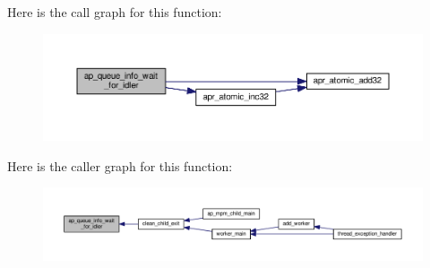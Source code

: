 Here is the call graph for this function\+:
\nopagebreak
\begin{figure}[H]
\begin{center}
\leavevmode
\includegraphics[width=350pt]{group__APACHE__MPM__EVENT_ga61e0f50817329b124d2ea67d9cfe0cbf_cgraph}
\end{center}
\end{figure}




Here is the caller graph for this function\+:
\nopagebreak
\begin{figure}[H]
\begin{center}
\leavevmode
\includegraphics[width=350pt]{group__APACHE__MPM__EVENT_ga61e0f50817329b124d2ea67d9cfe0cbf_icgraph}
\end{center}
\end{figure}


